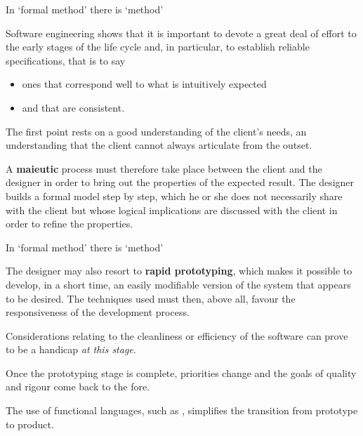 \documentclass[compress,dvips,xcolor={dvipsnames},t]{beamer}
\begin{document}
%
\begin{frame}{In `formal method' there is `method'}

  Software engineering shows that it is important to devote a
  great deal of effort to the early stages of the life cycle and, in
  particular, to establish reliable specifications, that is to say
  \begin{itemize}

    \item ones that correspond well to what is intuitively expected

    \item and that are consistent.

  \end{itemize}

  The first point rests on a good understanding of the client's needs,
  an understanding that the client cannot always articulate from the
  outset.

  \bigskip

  A \textbf{maieutic} process must therefore take place between the
  client and the designer in order to bring out the properties of the
  expected result. The designer builds a formal model step by step,
  which he or she does not necessarily share with the client but whose
  logical implications are discussed with the client in order to
  refine the properties.

\end{frame}

%
\begin{frame}{In `formal method' there is `method'}

  The designer may also resort to \textbf{rapid prototyping}, which
  makes it possible to develop, in a short time, an easily modifiable
  version of the system that appears to be desired. The techniques
  used must then, above all, favour the responsiveness of the
  development process.

  \bigskip

  Considerations relating to the cleanliness or efficiency of the
  software can prove to be a handicap \emph{at this stage}.

  \bigskip

  Once the prototyping stage is complete, priorities change and the
  goals of quality and rigour come back to the fore.

  \bigskip

  The use of functional languages, such as \OCaml, simplifies the
  transition from prototype to product.

\end{frame}
\end{document}
